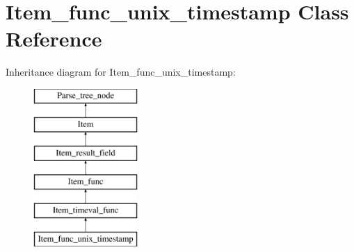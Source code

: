 \hypertarget{classItem__func__unix__timestamp}{}\section{Item\+\_\+func\+\_\+unix\+\_\+timestamp Class Reference}
\label{classItem__func__unix__timestamp}
Inheritance diagram for Item\+\_\+func\+\_\+unix\+\_\+timestamp\+:\begin{figure}[H]
\begin{center}
\leavevmode
\includegraphics[height=6.000000cm]{classItem__func__unix__timestamp}
\end{center}
\end{figure}
